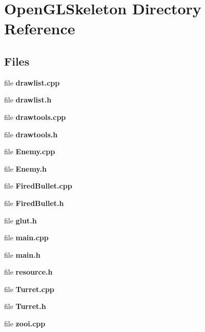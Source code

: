 \section{Open\+G\+L\+Skeleton Directory Reference}
\label{dir_1b2c061410577e7b18655437bf313fe8}
\subsection*{Files}
\begin{DoxyCompactItemize}
\item 
file {\bf drawlist.\+cpp}
\item 
file {\bf drawlist.\+h}
\item 
file {\bf drawtools.\+cpp}
\item 
file {\bf drawtools.\+h}
\item 
file {\bf Enemy.\+cpp}
\item 
file {\bf Enemy.\+h}
\item 
file {\bf Fired\+Bullet.\+cpp}
\item 
file {\bf Fired\+Bullet.\+h}
\item 
file {\bf glut.\+h}
\item 
file {\bf main.\+cpp}
\item 
file {\bf main.\+h}
\item 
file {\bf resource.\+h}
\item 
file {\bf Turret.\+cpp}
\item 
file {\bf Turret.\+h}
\item 
file {\bf zooi.\+cpp}
\end{DoxyCompactItemize}
